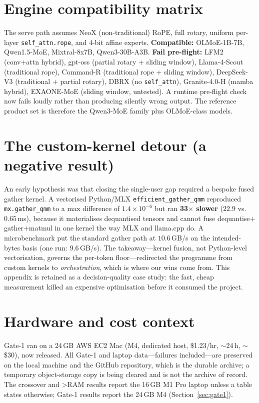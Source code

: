 \documentclass[11pt]{article}
\newcommand{\ppl}{\ensuremath{\times}}
\begin{document}
\section{Engine compatibility matrix}
The serve path assumes NeoX (non-traditional) RoPE, full rotary, uniform per-layer
\texttt{self\_attn.rope}, and 4-bit affine experts. \textbf{Compatible:} OLMoE-1B-7B,
Qwen1.5-MoE, Mixtral-8x7B, Qwen3-30B-A3B. \textbf{Fail pre-flight:} LFM2 (conv+attn
hybrid), gpt-oss (partial rotary + sliding window), Llama-4-Scout (traditional rope),
Command-R (traditional rope + sliding window), DeepSeek-V3 (traditional + partial
rotary), DBRX (no \texttt{self\_attn}), Granite-4.0-H (mamba hybrid), EXAONE-MoE
(sliding window, untested). A runtime pre-flight check now fails loudly rather than
producing silently wrong output. The reference product set is therefore the Qwen3-MoE
family plus OLMoE-class models.

\section{The custom-kernel detour (a negative result)}
An early hypothesis was that closing the single-user gap required a bespoke fused gather
kernel. A vectorised Python/MLX \texttt{efficient\_gather\_qmm} reproduced
\texttt{mx.gather\_qmm} to a max difference of $1.4\times10^{-6}$ but ran \textbf{33\ppl
slower} ($22.9$ vs.\ $0.65$\,ms), because it materialises dequantised tensors and cannot
fuse dequantise$+$gather$+$matmul in one kernel the way MLX and llama.cpp do. A
microbenchmark put the standard gather path at $10.6$\,GB/s on the intended-bytes basis
(one run: $9.6$\,GB/s). The takeaway---kernel fusion, not Python-level vectorisation,
governs the per-token floor---redirected the programme from custom kernels to
\emph{orchestration}, which is where our wins come from. This appendix is retained as a
decision-quality case study: the fast, cheap measurement killed an expensive optimisation
before it consumed the project.

\section{Hardware and cost context}
Gate-1 ran on a 24\,GB AWS EC2 Mac (M4, dedicated host, \$1.23/hr, ${\sim}$24\,h,
${\sim}$\$30), now released. All Gate-1 and laptop data---failures included---are
preserved on the local machine and the GitHub repository, which is the durable archive;
a temporary object-storage copy is being cleared and is not the archive of record. The
crossover and >RAM results report the 16\,GB M1 Pro laptop unless a table states
otherwise; Gate-1 results report the 24\,GB M4 (Section~\ref{sec:gate1}).
\end{document}
